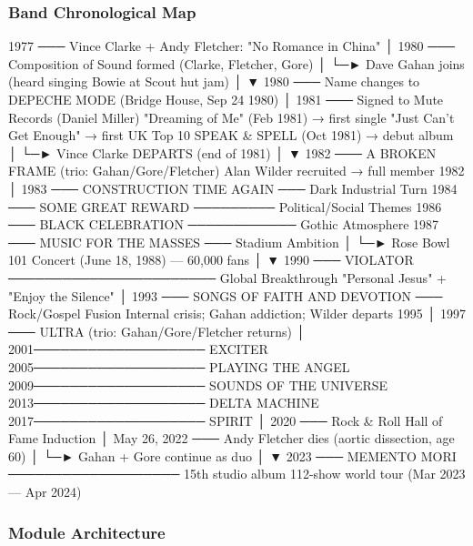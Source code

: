 \documentclass[11pt,letterpaper]{article}
\begin{document}
\subsubsection{Band Chronological Map}

\begin{asciibox}
1977 ─── Vince Clarke + Andy Fletcher: "No Romance in China"
         │
1980 ─── Composition of Sound formed (Clarke, Fletcher, Gore)
         │
         └─► Dave Gahan joins (heard singing Bowie at Scout hut jam)
                │
                ▼
1980 ─── Name changes to DEPECHE MODE (Bridge House, Sep 24 1980)
         │
1981 ─── Signed to Mute Records (Daniel Miller)
         "Dreaming of Me" (Feb 1981) → first single
         "Just Can't Get Enough" → first UK Top 10
         SPEAK & SPELL (Oct 1981) → debut album
         │
         └─► Vince Clarke DEPARTS (end of 1981)
                │
                ▼
1982 ─── A BROKEN FRAME (trio: Gahan/Gore/Fletcher)
         Alan Wilder recruited → full member 1982
         │
1983 ─── CONSTRUCTION TIME AGAIN ─── Dark Industrial Turn
1984 ─── SOME GREAT REWARD ───────── Political/Social Themes
1986 ─── BLACK CELEBRATION ──────────── Gothic Atmosphere
1987 ─── MUSIC FOR THE MASSES ─── Stadium Ambition
         │
         └─► Rose Bowl 101 Concert (June 18, 1988) — 60,000 fans
                │
                ▼
1990 ─── VIOLATOR ─────────────────────── Global Breakthrough
         "Personal Jesus" + "Enjoy the Silence"
         │
1993 ─── SONGS OF FAITH AND DEVOTION ─── Rock/Gospel Fusion
         Internal crisis; Gahan addiction; Wilder departs 1995
         │
1997 ─── ULTRA (trio: Gahan/Gore/Fletcher returns)
         │
2001─────────────────── EXCITER
2005─────────────────── PLAYING THE ANGEL
2009─────────────────── SOUNDS OF THE UNIVERSE
2013─────────────────── DELTA MACHINE
2017─────────────────── SPIRIT
         │
2020 ─── Rock & Roll Hall of Fame Induction
         │
May 26, 2022 ─── Andy Fletcher dies (aortic dissection, age 60)
         │
         └─► Gahan + Gore continue as duo
                │
                ▼
2023 ─── MEMENTO MORI ─────────────────── 15th studio album
         112-show world tour (Mar 2023 — Apr 2024)
\end{asciibox}

\subsubsection{Module Architecture}
\end{document}

